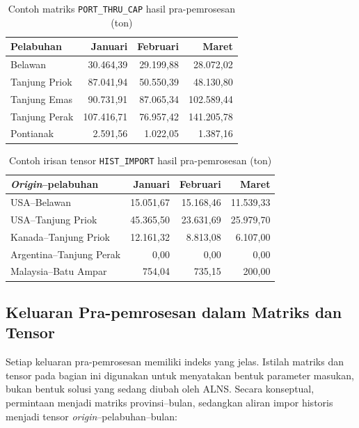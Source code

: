 \documentclass{file/TA-ITS}
\theoremstyle{definition}
\theoremstyle{definition}
\theoremstyle{plain}
\begin{document}
\begin{table}[H]
\centering
\caption{Contoh matriks \texttt{PORT\_THRU\_CAP} hasil pra-pemrosesan (ton)}
\label{tab:preprocessing_port_cap_matrix_example}
\scriptsize
\begin{tabular}{lrrr}
\toprule
\textbf{Pelabuhan} & \textbf{Januari} & \textbf{Februari} & \textbf{Maret} \\
\midrule
Belawan & 30.464,39 & 29.199,88 & 28.072,02 \\
Tanjung Priok & 87.041,94 & 50.550,39 & 48.130,80 \\
Tanjung Emas & 90.731,91 & 87.065,34 & 102.589,44 \\
Tanjung Perak & 107.416,71 & 76.957,42 & 141.205,78 \\
Pontianak & 2.591,56 & 1.022,05 & 1.387,16 \\
\bottomrule
\end{tabular}
\end{table}

\begin{table}[H]
\centering
\caption{Contoh irisan tensor \texttt{HIST\_IMPORT} hasil pra-pemrosesan (ton)}
\label{tab:preprocessing_hist_import_tensor_example}
\scriptsize
\begin{tabular}{lrrr}
\toprule
\textbf{\textit{Origin}--pelabuhan} & \textbf{Januari} & \textbf{Februari} & \textbf{Maret} \\
\midrule
USA--Belawan & 15.051,67 & 15.168,46 & 11.539,33 \\
USA--Tanjung Priok & 45.365,50 & 23.631,69 & 25.979,70 \\
Kanada--Tanjung Priok & 12.161,32 & 8.813,08 & 6.107,00 \\
Argentina--Tanjung Perak & 0,00 & 0,00 & 0,00 \\
Malaysia--Batu Ampar & 754,04 & 735,15 & 200,00 \\
\bottomrule
\end{tabular}
\end{table}

\subsection{Keluaran Pra-pemrosesan dalam Matriks dan Tensor}

Setiap keluaran pra-pemrosesan memiliki indeks yang jelas. Istilah matriks dan tensor pada bagian ini digunakan untuk menyatakan bentuk parameter masukan, bukan bentuk solusi yang sedang diubah oleh ALNS. Secara konseptual, permintaan menjadi matriks provinsi--bulan, sedangkan aliran impor historis menjadi tensor \textit{origin}--pelabuhan--bulan:
\end{document}
